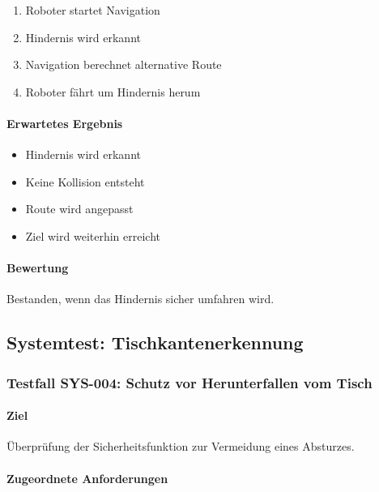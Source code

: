 \documentclass[
  a4paper,
  12pt,
  DIV=12,        %
  parskip=half,  %
  headings=small %
]{scrartcl}
\theoremstyle{definition}
\providecommand{\tightlist}{%
  \setlength{\itemsep}{0pt}\setlength{\parskip}{0pt}}
\theoremstyle{definition}
\begin{document}
\begin{enumerate}
\def\labelenumi{\arabic{enumi}.}
\tightlist
\item
  Roboter startet Navigation
\item
  Hindernis wird erkannt
\item
  Navigation berechnet alternative Route
\item
  Roboter fährt um Hindernis herum
\end{enumerate}

\paragraph{Erwartetes Ergebnis}\label{erwartetes-ergebnis-26}

\begin{itemize}
\tightlist
\item
  Hindernis wird erkannt
\item
  Keine Kollision entsteht
\item
  Route wird angepasst
\item
  Ziel wird weiterhin erreicht
\end{itemize}

\paragraph{Bewertung}\label{bewertung-26}

Bestanden, wenn das Hindernis sicher umfahren wird.

\subsection{Systemtest:
Tischkantenerkennung}\label{systemtest-tischkantenerkennung}

\subsubsection{Testfall SYS-004: Schutz vor Herunterfallen vom
Tisch}\label{testfall-sys-004-schutz-vor-herunterfallen-vom-tisch}

\paragraph{Ziel}\label{ziel-27}

Überprüfung der Sicherheitsfunktion zur Vermeidung eines Absturzes.

\paragraph{Zugeordnete
Anforderungen}\label{zugeordnete-anforderungen-27}
\end{document}

